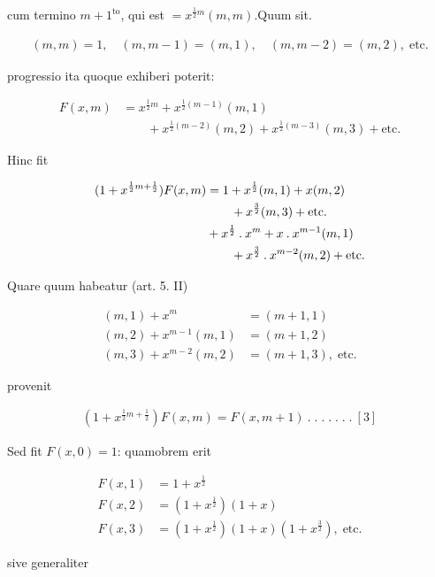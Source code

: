 %
cum termino $m+1^{\mathrm{to}}$, qui est $=x^{\frac12m}(m,m)$.\quad Quum sit.

\[
\begin{aligned}
(m,m)=1,\quad(m,m-1)=(m,1),\quad(m,m-2)=(m,2),\;\text{etc.}
\end{aligned}
\]

progressio ita quoque exhiberi poterit:

\[
\begin{aligned}
F(x,m)&=x^{\frac12m}+x^{\frac12(m-1)}(m,1)\\&\qquad+x^{\frac12(m-2)}(m,2)+x^{\frac12(m-3)}(m,3)+\text{etc.}
\end{aligned}
\]

Hinc fit

\[
\begin{aligned}
(1+x^{\frac12m+\frac12})F(x,m)&=1+x^{\frac12}(m,1)+x(m,2)\\&\qquad+x^{\frac32}(m,3)+\text{etc.}\\
&+x^{\frac12}\mathbin{.} x^m+x\mathbin{.} x^{m-1}(m,1)\\&\qquad+x^{\frac32}\mathbin{.} x^{m-2}(m,2)+\text{etc.}
\end{aligned}
\]

Quare quum habeatur (art. 5. II)

\[
\begin{aligned}
(m,1)+x^m&=(m+1,1)\\
(m,2)+x^{m-1}(m,1)&=(m+1,2)\\
(m,3)+x^{m-2}(m,2)&=(m+1,3),\;\text{etc.}
\end{aligned}
\]

provenit

\[
\begin{aligned}
(1+x^{\frac12m+\frac12})F(x,m)=F(x,m+1)\ .\; .\; .\; .\; .\; .\; .\ [3]
\end{aligned}
\]

Sed fit $F(x,0)=1$: quamobrem erit

\[
\begin{aligned}
F(x,1)&=1+x^{\frac12}\\
F(x,2)&=(1+x^{\frac12})(1+x)\\
F(x,3)&=(1+x^{\frac12})(1+x)(1+x^{\frac32}),\;\text{etc.}
\end{aligned}
\]

sive generaliter

